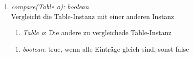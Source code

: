 \begin{enumerate}[+]
	\item \textit{compare(Table o): boolean} \\
	Vergleicht die Table-Instanz mit einer anderen Instanz
	\begin{enumerate}[$\bullet$]
		\item \textit{Table o}: Die andere zu vergleichede Table-Instanz
	\end{enumerate}
	\vspace{-0.2cm}
	\begin{enumerate}[$\circ$]
		\item \textit{boolean}: true, wenn alle Einträge gleich sind, sonst false
	\end{enumerate}
\end{enumerate}